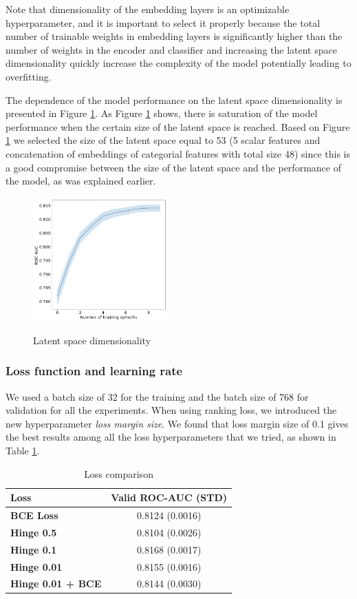 \documentclass[sigconf]{acmart}
\begin{document}
Note that dimensionality of the embedding layers is an optimizable hyperparameter, and it is important to select it properly because  the total number of trainable weights in embedding layers is significantly higher than the number of weights in the encoder and classifier and increasing the latent space dimensionality quickly increase the complexity of the model potentially leading to overfitting.

The dependence of the model performance on the latent space dimensionality is presented in Figure \ref{fig-lat}. As Figure \ref{fig-lat} shows, there is saturation of the model performance when the certain size of the latent space is reached. Based on Figure \ref{tab-loss} we selected the size of the latent space equal to 53 (5 scalar features and concatenation of embeddings of categorial features with total size 48) since this is a good compromise between the size of the latent space and the performance of the model, as was explained earlier.

\begin{figure}[ht]
  \caption{Latent space dimensionality}
  \includegraphics[width=0.46\textwidth]{figures/latent-pic.png}
  \label{fig-lat}
\end{figure}

\subsubsection{Loss function and learning rate}

We used a batch size of 32 for the training and the batch size of 768 for validation for all the experiments. When using ranking loss, we introduced the new hyperparameter \textit{loss margin size}. We found that loss margin size of 0.1 gives the best results among all the loss hyperparameters that we tried, as shown in Table \ref{tab-loss}. 

\begin{table}[ht]
\caption{Loss comparison}
\begin{tabular}{ | l | c |  }
\hline
\textbf{Loss} & \textbf{Valid ROC-AUC (STD)} \\
\hline
\textbf{BCE Loss} & 0.8124 (0.0016)  \\
\textbf{Hinge 0.5} & 0.8104 (0.0026)  \\
\textbf{Hinge 0.1} & 0.8168 (0.0017)  \\
\textbf{Hinge 0.01} & 0.8155 (0.0016)  \\
\textbf{Hinge 0.01 + BCE} & 0.8144 (0.0030)  \\
\hline
\end{tabular}
\label{tab-loss}
\end{table}
\end{document}
